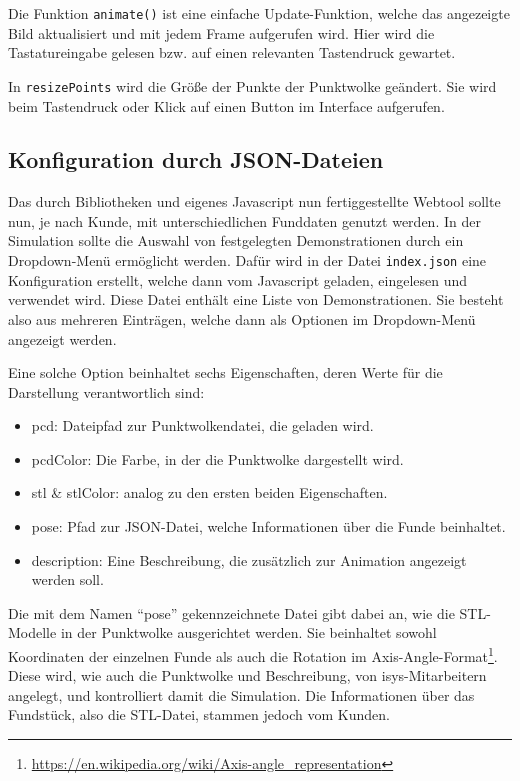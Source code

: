 Die Funktion \texttt{animate()} ist eine einfache Update-Funktion, welche das
angezeigte Bild aktualisiert und mit jedem Frame aufgerufen wird. Hier wird
die Tastatureingabe gelesen bzw. auf einen relevanten Tastendruck gewartet.

In \texttt{resizePoints} wird die Größe der Punkte der Punktwolke geändert. Sie wird beim Tastendruck oder Klick auf einen Button im Interface aufgerufen.



\subsection{Konfiguration durch JSON-Dateien}

Das durch Bibliotheken und eigenes Javascript nun fertiggestellte Webtool sollte nun, je nach Kunde, mit unterschiedlichen Funddaten genutzt werden. In der Simulation sollte die Auswahl von festgelegten Demonstrationen durch ein Dropdown-Menü ermöglicht werden. Dafür wird in der Datei \texttt{index.json} eine Konfiguration erstellt, welche dann vom Javascript geladen, eingelesen und verwendet wird. Diese Datei enthält eine Liste von Demonstrationen. Sie besteht also aus mehreren Einträgen, welche dann als Optionen im Dropdown-Menü angezeigt werden.

\begin{code}
\end{code}

Eine solche Option beinhaltet sechs Eigenschaften, deren Werte für die Darstellung verantwortlich sind:

\begin{itemize}
	\item pcd: Dateipfad zur Punktwolkendatei, die geladen wird.
	\item pcdColor: Die Farbe, in der die Punktwolke dargestellt wird.
	\item stl \& stlColor: analog zu den ersten beiden Eigenschaften.
	\item pose: Pfad zur JSON-Datei, welche Informationen über die Funde beinhaltet.
	\item description: Eine Beschreibung, die zusätzlich zur Animation angezeigt werden soll.
\end{itemize}

Die mit dem Namen ``pose'' gekennzeichnete Datei gibt dabei an, wie die STL-Modelle in der Punktwolke ausgerichtet werden. Sie beinhaltet sowohl Koordinaten der einzelnen Funde als auch die Rotation im Axis-Angle-Format\footnote{\url{https://en.wikipedia.org/wiki/Axis-angle_representation}}. Diese wird, wie auch die Punktwolke und Beschreibung, von isys-Mitarbeitern angelegt, und kontrolliert damit die Simulation. Die Informationen über das Fundstück, also die STL-Datei, stammen jedoch vom Kunden.